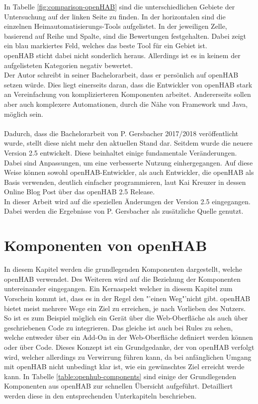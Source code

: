 In Tabelle \ref{fig:comparison-openHAB} sind die unterschiedlichen Gebiete der Untersuchung auf der linken Seite zu finden. In der horizontalen sind die einzelnen Heimautomatisierungs-Tools aufgelistet. In der jeweiligen Zelle, basierend auf Reihe und Spalte, sind die Bewertungen festgehalten. Dabei zeigt ein blau markiertes Feld, welches das beste Tool für ein Gebiet ist.\\
openHAB sticht dabei nicht sonderlich heraus. Allerdings ist es in keinem der aufgelisteten Kategorien negativ bewertet.\\
Der Autor schreibt in seiner Bachelorarbeit, dass er persönlich auf openHAB setzen würde. Dies liegt einerseits daran, dass die Entwickler von openHAB stark an Vereinfachung von komplizierteren Komponenten arbeitet. Andererseits sollen aber auch komplexere Automationen, durch die Nähe von Framework und Java, möglich sein.\cite{BA01:OPH}
\\
\\
Dadurch, dass die Bachelorarbeit von P. Gersbacher 2017/2018 veröffentlicht wurde, stellt diese nicht mehr den aktuellen Stand dar. Seitdem wurde die neuere Version 2.5 entwickelt. Diese beinhaltet einige fundamentale Veränderungen. Dabei sind Anpassungen, um eine verbesserte Nutzung einhergegangen. Auf diese Weise können sowohl openHAB-Entwickler, als auch Entwickler, die openHAB als Basis verwenden, deutlich einfacher programmieren, laut Kai Kreuzer in dessen Online Blog Post über das openHAB 2.5 Release.\cite{openHAB02:OH}\\
In dieser Arbeit wird auf die speziellen Änderungen der Version 2.5 eingegangen. Dabei werden die Ergebnisse von P. Gersbacher als zusätzliche Quelle genutzt.


\section{Komponenten von openHAB}\label{sec:technischeSicht}
In diesem Kapitel werden die grundlegenden Komponenten dargestellt, welche openHAB verwendet. Des Weiteren wird auf die  Beziehung der Komponenten untereinander eingegangen.
Ein Kernaspekt welcher in diesem Kapitel zum Vorschein kommt ist, dass es in der Regel den "'einen Weg"'nicht gibt. openHAB bietet meist mehrere Wege ein Ziel zu erreichen, je nach Vorlieben des Nutzers. So ist es zum Beispiel möglich ein Gerät über die Web-Oberfläche als auch über geschriebenen Code zu integrieren. Das gleiche ist auch bei Rules zu sehen, welche entweder über ein Add-On in der Web-Oberfläche definiert werden können oder über Code. Dieses Konzept ist ein Grundgedanke, der von openHAB verfolgt wird, welcher allerdings zu Verwirrung führen kann, da bei anfänglichen Umgang mit openHAB nicht unbedingt klar ist, wie ein gewünschtes Ziel erreicht werde kann.
In Tabelle \ref{table:openhub-components} sind einige der Grundlegenden Komponenten aus openHAB zur schnellen Übersicht aufgeführt. Detailliert werden diese in den entsprechenden Unterkapiteln beschrieben.

